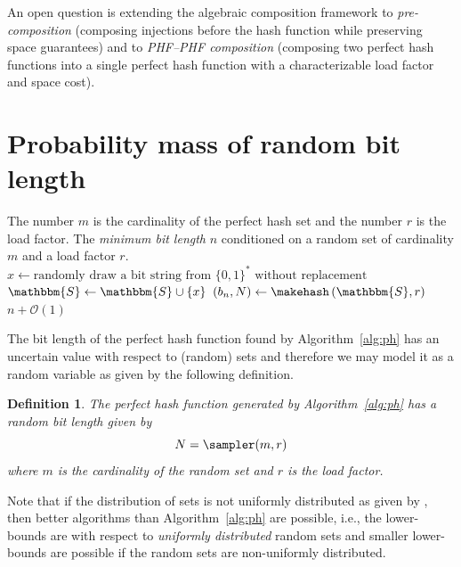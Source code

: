 \documentclass[hidelinks,11pt,final]{article}
\newcommand{\envnumstyle}{section}
\theoremstyle{plain}
\newtheorem{definition}{Definition}[\envnumstyle]
\begin{document}
An open question is extending the algebraic composition framework to \emph{pre-composition} (composing injections before the hash function while preserving space guarantees) and to \emph{PHF--PHF composition} (composing two perfect hash functions into a single perfect hash function with a characterizable load factor and space cost).


\appendix
\appendixpage
\addappheadtotoc
\section{Probability mass of random bit length}
\begin{algorithm}
    \caption{Bit length sampler of the cryptographic perfect hash function}
    \label{alg:sampler}
    \KwIn
    {
        The number $m$ is the cardinality of the perfect hash set and
        the number $r$ is the load factor.
    }
    \KwOut
    {
        The \emph{minimum bit length} $n$ conditioned on a random set of cardinality $m$ and a load factor $r$.
    }
    {
        {
            $x \gets \text{randomly draw a bit string from $\{0,1\}^{*}$ without replacement}$\;
            $\mathbbm{S} \gets \mathbbm{S} \cup \{x\}$\;
        }    
        $(b_n,N) \gets \makehash\left(\mathbbm{S}, r\right)$\;
        \Return $n + \mathcal{O}(1)$\;
    }
\end{algorithm}
The bit length of the perfect hash function found by Algorithm~\ref{alg:ph} has an uncertain value with respect to (random) sets and therefore we may model it as a random variable as given by the following definition.
\begin{definition}
\label{def:N_rv}
The perfect hash function generated by Algorithm~\ref{alg:ph} has a random bit length given by
\begin{equation}
    N = \sampler(m,r)
\end{equation}
where $m$ is the cardinality of the random set and $r$ is the load factor.
\end{definition}
Note that if the distribution of sets is not uniformly distributed as given by 
\sampler, then better algorithms than Algorithm~\ref{alg:ph} are possible, i.e., the 
lower-bounds are with respect to \emph{uniformly distributed}
random sets and smaller lower-bounds are possible if the random sets are 
non-uniformly distributed.
\end{document}
